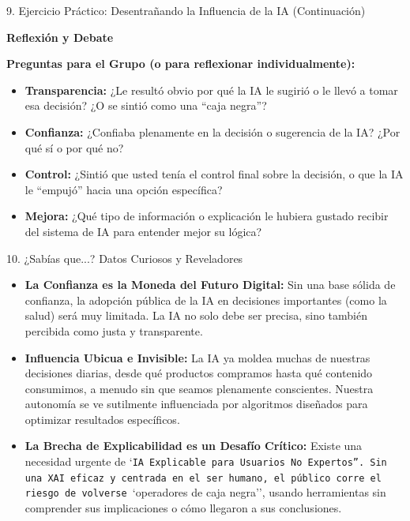 \documentclass[aspectratio=169]{beamer}
\begin{document}
\begin{frame}[fragile]{9. Ejercicio Práctico: Desentrañando la Influencia de la IA (Continuación)}


\textbf{Reflexión y Debate}

\textbf{Preguntas para el Grupo (o para reflexionar individualmente):}

\begin{itemize}
  \item \textbf{Transparencia:} ¿Le resultó obvio por qué la IA le sugirió o le llevó a tomar esa decisión? ¿O se sintió como una ``caja negra''?
  \item \textbf{Confianza:} ¿Confiaba plenamente en la decisión o sugerencia de la IA? ¿Por qué sí o por qué no?
  \item \textbf{Control:} ¿Sintió que usted tenía el control final sobre la decisión, o que la IA le ``empujó'' hacia una opción específica?
  \item \textbf{Mejora:} ¿Qué tipo de información o explicación le hubiera gustado recibir del sistema de IA para entender mejor su lógica?
\end{itemize}
\end{frame}



\begin{frame}[fragile]{10. ¿Sabías que...? Datos Curiosos y Reveladores}


\begin{itemize}
  \item \textbf{La Confianza es la Moneda del Futuro Digital:} Sin una base sólida de confianza, la adopción pública de la IA en decisiones importantes (como la salud) será muy limitada. La IA no solo debe ser precisa, sino también percibida como justa y transparente.
  \item \textbf{Influencia Ubicua e Invisible:} La IA ya moldea muchas de nuestras decisiones diarias, desde qué productos compramos hasta qué contenido consumimos, a menudo sin que seamos plenamente conscientes. Nuestra autonomía se ve sutilmente influenciada por algoritmos diseñados para optimizar resultados específicos.
  \item \textbf{La Brecha de Explicabilidad es un Desafío Crítico:} Existe una necesidad urgente de `\texttt{IA Explicable para Usuarios No Expertos''. Sin una XAI eficaz y centrada en el ser humano, el público corre el riesgo de volverse }`operadores de caja negra'', usando herramientas sin comprender sus implicaciones o cómo llegaron a sus conclusiones.
\end{itemize}
\end{frame}
\end{document}
